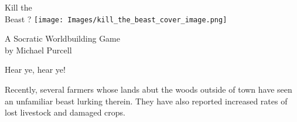 \documentclass[a6paper, 11pt, parskip=half, DIV=15]{scrartcl}
\begin{document}
\begin{titlepage}
\enlargethispage{3.0\baselineskip}
\setmainfont[Scale=2.25]{Grizzly Attack}
\Huge
\begin{center}
\vspace*{-0.5\baselineskip}
Kill the\\
Beast ?
%
\vfill
\vspace{-0.75ex}
\texttt{[image: Images/kill\_the\_beast\_cover\_image.png]}

\vfill


\LARGE
\setmainfont[Scale=1.0]{Water Brush}
\vspace{-2.5ex}
A Socratic Worldbuilding Game\\
by Michael Purcell
\end{center}

%
%
\end{titlepage}
\thispagestyle{empty}
\enlargethispage{1.75\baselineskip}
\setmainfont[Scale=1.05]{EBGaramond-Italic}
\Large
\noindent Hear ye, hear ye!

\bigskip

Recently, several farmers whose lands abut the woods outside of town have seen an unfamiliar beast lurking therein. They have also reported increased rates of lost livestock and damaged crops.
\end{document}
